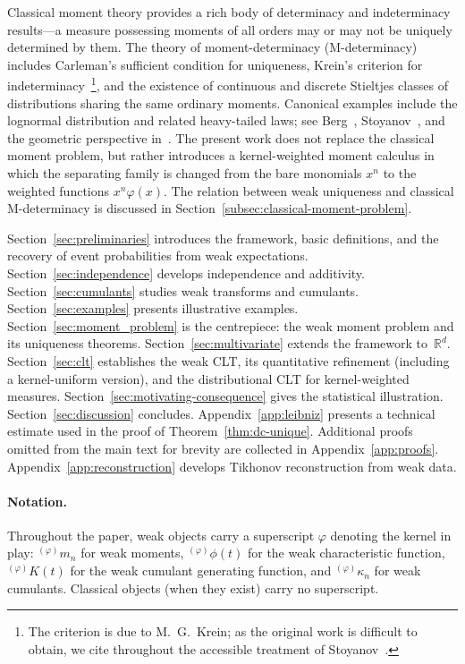 \documentclass[12pt]{article}
\theoremstyle{definition}
\newcommand{\R}{\mathbb{R}}
\begin{document}
Classical moment theory provides a rich body of determinacy and
indeterminacy results---a measure possessing moments of all orders may
or may not be uniquely determined by them.  The theory of
moment-determinacy (M-determinacy) includes Carleman's sufficient
condition for uniqueness, Krein's criterion for
indeterminacy~\cite{Stoyanov2000Krein}\footnote{The criterion is due to
M.~G.~Krein; as the original work is difficult to obtain, we cite throughout
the accessible treatment of Stoyanov~\cite{Stoyanov2000Krein}.}, and the existence of continuous and
discrete Stieltjes classes of distributions sharing the same ordinary
moments.  Canonical examples include the lognormal distribution and
related heavy-tailed laws; see Berg~\cite{Berg1988},
Stoyanov~\cite{Stoyanov2013}, and the geometric
perspective in~\cite{StoyanovInverardiTagliani2023}.  The present work
does not replace the classical moment problem, but rather introduces a
kernel-weighted moment calculus in which the separating family is
changed from the bare monomials $x^n$ to the weighted functions
$x^n\varphi(x)$.  The relation between weak uniqueness and classical
M-determinacy is discussed in
Section~\ref{subsec:classical-moment-problem}.

Section~\ref{sec:preliminaries} introduces the framework, basic definitions, and the recovery of event probabilities from weak expectations.  Section~\ref{sec:independence} develops independence and additivity.  Section~\ref{sec:cumulants} studies weak transforms and cumulants.  Section~\ref{sec:examples} presents illustrative examples.  Section~\ref{sec:moment_problem} is the centrepiece: the weak moment problem and its uniqueness theorems.  Section~\ref{sec:multivariate} extends the framework to~$\R^d$.  Section~\ref{sec:clt} establishes the weak CLT, its quantitative refinement (including a kernel-uniform version), and the distributional CLT for kernel-weighted measures.  Section~\ref{sec:motivating-consequence} gives the statistical illustration.  Section~\ref{sec:discussion} concludes.  Appendix~\ref{app:leibniz} presents a technical estimate used in the proof of Theorem~\ref{thm:dc-unique}. Additional proofs omitted from the main text for brevity are collected in Appendix~\ref{app:proofs}.  Appendix~\ref{app:reconstruction} develops Tikhonov reconstruction from weak data.

\paragraph{Notation.}
Throughout the paper, weak objects carry a superscript $\varphi$ denoting the kernel in play: ${}^{(\varphi)}m_n$ for weak moments, ${}^{(\varphi)}\phi(t)$ for the weak characteristic function, ${}^{(\varphi)}K(t)$ for the weak cumulant generating function, and ${}^{(\varphi)}\kappa_n$ for weak cumulants.  Classical objects (when they exist) carry no superscript.  
\end{document}
